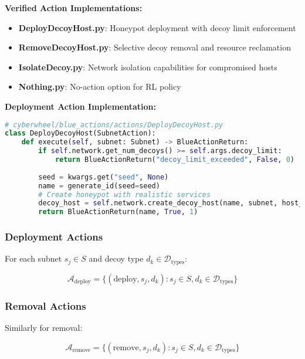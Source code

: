 \documentclass[12pt,a4paper]{article}
\begin{document}
\textbf{Verified Action Implementations:}
\begin{itemize}
    \item \textbf{DeployDecoyHost.py}: Honeypot deployment with decoy limit enforcement
    \item \textbf{RemoveDecoyHost.py}: Selective decoy removal and resource reclamation  
    \item \textbf{IsolateDecoy.py}: Network isolation capabilities for compromised hosts
    \item \textbf{Nothing.py}: No-action option for RL policy
\end{itemize}

\textbf{Deployment Action Implementation:}
\begin{lstlisting}[language=Python, caption=Deploy Decoy Implementation]
# cyberwheel/blue_actions/actions/DeployDecoyHost.py
class DeployDecoyHost(SubnetAction):
    def execute(self, subnet: Subnet) -> BlueActionReturn:
        if self.network.get_num_decoys() >= self.args.decoy_limit:
            return BlueActionReturn("decoy_limit_exceeded", False, 0)
        
        seed = kwargs.get("seed", None)
        name = generate_id(seed=seed)
        # Create honeypot with realistic services
        decoy_host = self.network.create_decoy_host(name, subnet, host_type)
        return BlueActionReturn(name, True, 1)
\end{lstlisting}

\subsubsection{Deployment Actions}
For each subnet $s_j \in S$ and decoy type $d_k \in \mathcal{D}_{\text{types}}$:

\begin{equation}
\mathcal{A}_{\text{deploy}} = \{(\text{deploy}, s_j, d_k) : s_j \in S, d_k \in \mathcal{D}_{\text{types}}\}
\end{equation}

\subsubsection{Removal Actions}
Similarly for removal:

\begin{equation}
\mathcal{A}_{\text{remove}} = \{(\text{remove}, s_j, d_k) : s_j \in S, d_k \in \mathcal{D}_{\text{types}}\}
\end{equation}
\end{document}
